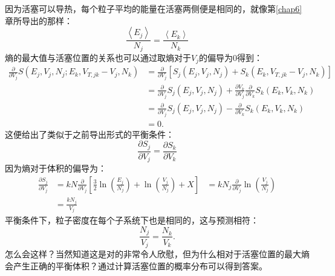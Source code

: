 \documentclass[UTF8]{ctexart}
\numberwithin{equation}{section}%
\numberwithin{figure}{section}%
\begin{document}
    因为活塞可以导热，每个粒子平均的能量在活塞两侧便是相同的，就像第\ref{chap6}章所导出的那样：
    \begin{equation}
        \frac{\left\langle E_{j}\right\rangle}{N_{j}}=\frac{\left\langle E_{k}\right\rangle}{N_{k}}
    \end{equation}
    熵的最大值与活塞位置的关系也可以通过取熵对于$V_j$的偏导为$0$得到：
    \begin{equation}
        \begin{aligned}
            \frac{\partial}{\partial V_{j}} S\left(E_{j}, V_{j}, N_{j} ; E_{k}, V_{T, j k}-V_{j}, N_{k}\right) &=\frac{\partial}{\partial V_{j}}\left[S_{j}\left(E_{j}, V_{j}, N_{j}\right)+S_{k}\left(E_{k}, V_{T, j k}-V_{j}, N_{k}\right)\right] \\
            &=\frac{\partial}{\partial V_{j}} S_{j}\left(E_{j}, V_{j}, N_{j}\right)+\frac{\partial V_{k}}{\partial V_{j}} \frac{\partial}{\partial V_{k}} S_{k}\left(E_{k}, V_{k}, N_{k}\right) \\
            &=\frac{\partial}{\partial V_{j}} S_{j}\left(E_{j}, V_{j}, N_{j}\right)-\frac{\partial}{\partial V_{k}} S_{k}\left(E_{k}, V_{k}, N_{k}\right) \\
            &=0 .
            \end{aligned}
    \end{equation}
    这便给出了类似于之前导出形式的平衡条件：
    \begin{equation}
        \frac{\partial S_{j}}{\partial V_{j}}=\frac{\partial S_{k}}{\partial V_{k}}
    \end{equation}
    因为熵对于体积的偏导为：
    \begin{equation}
        \begin{aligned}
            \frac{\partial S_{j}}{\partial V_{j}}&=k N \frac{\partial}{\partial V_{j}}\left[\frac{3}{2} \ln \left(\frac{E_{j}}{N_{j}}\right)+\ln \left(\frac{V_{j}}{N_{j}}\right)+X\right]
            &=k N_{j} \frac{\partial}{\partial V_{j}} \ln \left(\frac{V_{j}}{N_{j}}\right) \\
            &=\frac{k N_{j}}{V_{j}}
        \end{aligned}
    \end{equation}
    平衡条件下，粒子密度在每个子系统下也是相同的，这与预测相符：
    \begin{equation}
        \frac{N_{j}}{V_{j}}=\frac{N_{k}}{V_{k}} .
    \end{equation}
    怎么会这样？当然知道这是对的非常令人欣慰，但为什么相对于活塞位置的最大熵会产生正确的平衡体积？通过计算活塞位置的概率分布可以得到答案。
\end{document}
